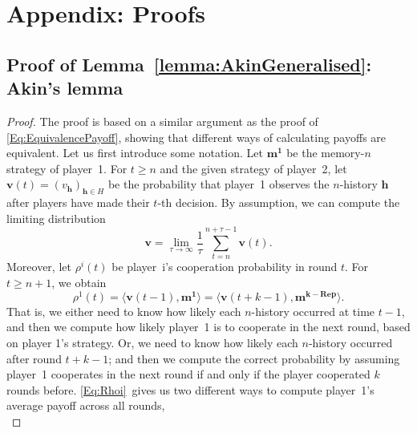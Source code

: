 \documentclass[9pt,twoside,lineno]{pnas-new}
\theoremstyle{plainCl1}
\theoremstyle{plainCl2}
\begin{document}
\clearpage
\newpage




\section{Appendix: Proofs}
\label{section:appendix}


\subsection{Proof of Lemma~\ref{lemma:AkinGeneralised}: Akin's lemma}

\begin{proof}
The proof is based on a similar argument as the proof of \eqref{Eq:EquivalencePayoff}, showing that different ways of calculating payoffs are equivalent. 
Let us first introduce some notation. 
Let $\mathbf{m^1}$ be the memory-$n$ strategy of player~1. 
For $t\!\ge\!n$ and the given strategy of player~2, let $\mathbf{v}(t)\!=\!(v_\mathbf{h})_{\mathbf{h}\in H}$ be the probability that player~1 observes the $n$-history $\mathbf{h}$ after players have made their $t$-th decision. 
By assumption, we can compute the limiting distribution
\begin{equation} \label{Eq:TimeAverageAppendix}
\mathbf{v} = \lim_{\tau\to\infty} \frac{1}{\tau} \sum_{t=n}^{n+\tau-1} \mathbf{v}(t).  
\end{equation}
Moreover, let $\rho^i(t)$ be player~i's cooperation probability in round $t$. 
For $t\!\ge\!n\!+\!1$, we obtain 
\begin{equation} \label{Eq:Rhoi}
\rho^1(t) = \big\langle \mathbf{v}(t\!-\!1) , \mathbf{m^1}\big\rangle = \big\langle \mathbf{v}(t\!+\!k\!-\!1), \mathbf{m^{k-\text{Rep}}}\big\rangle.
\end{equation}
That is, we either need to know how likely each $n$-history occurred at time $t\!-\!1$, and then we compute how likely player~1 is to cooperate in the next round, based on player 1's strategy. 
Or, we need to know how likely each $n$-history occurred after round $t\!+\!k\!-\!1$; and then we compute the correct probability by assuming player~1 cooperates in the next round if and only if the player cooperated $k$ rounds before. 
\eqref{Eq:Rhoi}~gives us two different ways to compute player~1's average payoff across all rounds,
\begin{equation}

\end{equation}
\end{proof}
\end{document}
